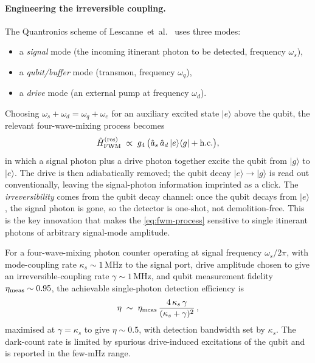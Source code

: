 \paragraph{Engineering the irreversible coupling.}
The Quantronics scheme of Lescanne~et~al.~\cite{lescanne2020} uses
three modes:
\begin{itemize}
  \item a \emph{signal} mode (the incoming itinerant photon to
        be detected, frequency $\omega_s$),
  \item a \emph{qubit/buffer} mode (transmon, frequency $\omega_q$),
  \item a \emph{drive} mode (an external pump at frequency
        $\omega_d$).
\end{itemize}
Choosing $\omega_s + \omega_d = \omega_q + \omega_e$ for an
auxiliary excited state $|e\rangle$ above the qubit, the
relevant four-wave-mixing process becomes
\begin{equation}
\label{eq:fwm-process}
\hat{H}_{\rm FWM}^{(\rm res)}
\;\propto\; g_4\,\bigl(\hat a_s\,\hat a_d\,|e\rangle\langle g| + \hbox{h.c.}\bigr),
\end{equation}
in which a signal photon plus a drive photon together excite the
qubit from $|g\rangle$ to $|e\rangle$. The drive is then
adiabatically removed; the qubit decay $|e\rangle\to|g\rangle$ is
read out conventionally, leaving the signal-photon information
imprinted as a click. The \emph{irreversibility} comes from the
qubit decay channel: once the qubit decays from $|e\rangle$, the
signal photon is gone, so the detector is one-shot, not
demolition-free. This is the key innovation that makes the
\cref{eq:fwm-process} sensitive to single itinerant photons of
arbitrary signal-mode amplitude.

\begin{statement}
\label{stmt:fwm-efficiency}
For a four-wave-mixing photon counter operating at signal
frequency $\omega_s/2\pi$, with mode-coupling rate
$\kappa_s\sim 1\,\text{MHz}$ to the signal port, drive amplitude
chosen to give an irreversible-coupling rate
$\gamma\sim 1\,\text{MHz}$, and qubit measurement fidelity
$\eta_{\rm meas}\sim 0.95$, the achievable single-photon
detection efficiency is~\cite{lescanne2020}
\begin{equation}
\label{eq:fwm-efficiency}
\eta \;\sim\; \eta_{\rm meas}\,\frac{4\,\kappa_s\,\gamma}{(\kappa_s+\gamma)^2}\,,
\end{equation}
maximised at $\gamma=\kappa_s$ to give $\eta\sim 0.5$, with
detection bandwidth set by $\kappa_s$. The dark-count rate is
limited by spurious drive-induced excitations of the qubit and
is reported in the few-mHz range.
\end{statement}

